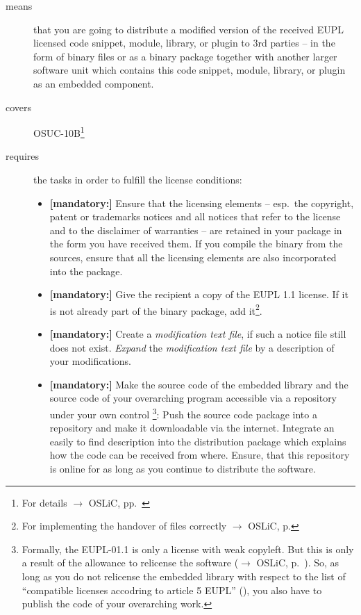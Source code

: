 \begin{description}
\item[means] that you are going to distribute a modified version of the received
EUPL licensed code snippet, module, library, or plugin to 3rd parties -- in the
form of binary files or as a binary package together with another larger
software unit which contains this code snippet, module, library, or plugin as an
embedded component.
\item[covers] OSUC-10B\footnote{For details $\rightarrow$ OSLiC, pp.\
\pageref{OSUC-10B-DEF}}
\item[requires] the tasks in order to fulfill the license conditions:
\begin{itemize}
  
  
  \item \textbf{[mandatory:]} Ensure that the licensing elements -- esp.\ the
  copyright, patent or trademarks notices and all notices that refer to the
  license and to the disclaimer of warranties -- are retained in your package in
  the form you have received them. If you compile the binary from the sources,
  ensure that all the licensing elements are also incorporated into the package.
  
  \item \textbf{[mandatory:]} Give the recipient a copy of the EUPL 1.1
  license. If it is not already part of the binary package, add
  it\footnote{For implementing the handover of files correctly $\rightarrow$
  OSLiC, p. \pageref{DistributingFilesHint}}.
 
  \item \textbf{[mandatory:]} Create a \emph{modification text file}, if such a
  notice file still does not exist. \emph{Expand} the \emph{modification text
  file} by a description of your modifications.
  
  \item \textbf{[mandatory:]} Make the source code of the embedded library and
  the source code of your overarching program accessible via a repository under
  your own control \footnote{Formally, the EUPL-01.1 is only a license with weak
  copyleft. But this is only a result of the allowance to relicense the software
  ($\rightarrow$ OSLiC, p.\ \pageref{sec:ProtectingPowerOfEupl}). So, as long as
  you do not relicense the embedded library with respect to the list of
  \enquote{compatible licenses accodring to article 5 EUPL} (\cite[cf.][\nopage
  wp §5 and Appendix]{EuplLicense2007en}), you also have to publish the code of
  your overarching work.}: Push the source code package into a repository and
  make it downloadable via the internet. Integrate an easily to find description
  into the distribution package which explains how the code can be received from
  where. Ensure, that this repository is online for as long as you continue to
  distribute the software.
  

\end{itemize}
\end{description}

